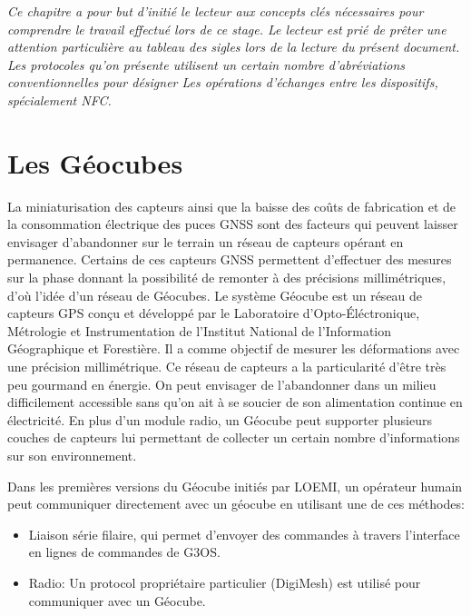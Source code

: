 \documentclass{themeensg}
\begin{document}


\textit{ Ce chapitre a pour but d'initié le lecteur aux concepts clés nécessaires pour comprendre le travail effectué lors de ce stage.
Le lecteur est prié de prêter une attention particulière au tableau des sigles lors de la lecture du présent document. Les protocoles qu'on présente utilisent un certain nombre d’abréviations conventionnelles pour désigner Les opérations d'échanges entre les dispositifs, spécialement NFC. }

\section{Les Géocubes}
La miniaturisation des capteurs ainsi que la baisse des coûts de fabrication et de la consommation électrique des puces GNSS sont des facteurs qui peuvent laisser envisager d'abandonner sur le terrain un réseau de capteurs opérant en permanence. Certains de ces capteurs GNSS permettent d'effectuer des mesures sur la phase donnant la possibilité de remonter à des précisions millimétriques, d'où l'idée d'un réseau de Géocubes. Le système Géocube est un réseau de capteurs GPS conçu et développé par le Laboratoire d'Opto-Éléctronique, Métrologie et Instrumentation de l'Institut National de l'Information Géographique et Forestière. Il a comme objectif de mesurer les déformations avec une précision millimétrique. Ce réseau de capteurs a la particularité d'être très peu gourmand en énergie. On peut envisager de l'abandonner dans un milieu difficilement accessible sans qu'on ait à se soucier de son alimentation continue en électricité. En plus d'un module radio, un Géocube peut supporter plusieurs couches de capteurs lui permettant de collecter un certain nombre d'informations sur son environnement.

Dans les premières versions du Géocube initiés par LOEMI, un opérateur humain peut communiquer directement avec un géocube en utilisant une de ces méthodes:

\begin{itemize}
\item Liaison série filaire, qui permet d'envoyer des commandes  à travers l'interface en lignes de commandes de G3OS.
\item Radio: Un protocol propriétaire particulier (DigiMesh\textcopyright) est utilisé pour communiquer avec un Géocube.
\end{itemize}
\end{document}
